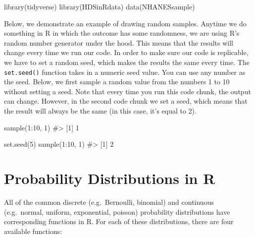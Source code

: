 \documentclass[
  letterpaper,
]{krantz}
\makeatletter
\newenvironment{Shaded}{\begin{snugshade}}{\end{snugshade}}
\newcommand{\CommentTok}[1]{\textcolor[rgb]{0.37,0.37,0.37}{#1}}
\newcommand{\DecValTok}[1]{\textcolor[rgb]{0.68,0.00,0.00}{#1}}
\newcommand{\FunctionTok}[1]{\textcolor[rgb]{0.28,0.35,0.67}{#1}}
\newcommand{\NormalTok}[1]{\textcolor[rgb]{0.00,0.23,0.31}{#1}}
\newcommand{\SpecialCharTok}[1]{\textcolor[rgb]{0.37,0.37,0.37}{#1}}
\newenvironment{kframe}{%
\medskip{}
\setlength{\fboxsep}{.8em}
 \def\at@end@of@kframe{}%
 \ifinner\ifhmode%
  \def\at@end@of@kframe{\end{minipage}}%
  \begin{minipage}{\columnwidth}%
 \fi\fi%
 \def\FrameCommand##1{\hskip\@totalleftmargin \hskip-\fboxsep
 \colorbox{shadecolor}{##1}\hskip-\fboxsep
     \hskip-\linewidth \hskip-\@totalleftmargin \hskip\columnwidth}%
 \MakeFramed {\advance\hsize-\width
   \@totalleftmargin\z@ \linewidth\hsize
   \@setminipage}}%
 {\par\unskip\endMakeFramed%
 \at@end@of@kframe}
\renewenvironment{Shaded}{\begin{kframe}}{\end{kframe}}
\makeatother
\begin{document}
\begin{Shaded}
\begin{Highlighting}[]
\FunctionTok{library}\NormalTok{(tidyverse)}
\FunctionTok{library}\NormalTok{(HDSinRdata)}
\FunctionTok{data}\NormalTok{(NHANESsample)}
\end{Highlighting}
\end{Shaded}

Below, we demonstrate an example of drawing random samples. Anytime we
do something in R in which the outcome has some randomness, we are using
R's random number generator under the hood. This means that the results
will change every time we run our code. In order to make sure our code
is replicable, we have to set a random seed, which makes the results the
same every time. The \texttt{set.seed()} function takes in a numeric
seed value. You can use any number as the seed. Below, we first sample a
random value from the numbers 1 to 10 without setting a seed. Note that
every time you run this code chunk, the output can change. However, in
the second code chunk we set a seed, which means that the result will
always be the same (in this case, it's equal to 2).

\begin{Shaded}
\begin{Highlighting}[]
\FunctionTok{sample}\NormalTok{(}\DecValTok{1}\SpecialCharTok{:}\DecValTok{10}\NormalTok{, }\DecValTok{1}\NormalTok{)}
\CommentTok{\#\textgreater{} [1] 1}
\end{Highlighting}
\end{Shaded}

\begin{Shaded}
\begin{Highlighting}[]
\FunctionTok{set.seed}\NormalTok{(}\DecValTok{5}\NormalTok{)}
\FunctionTok{sample}\NormalTok{(}\DecValTok{1}\SpecialCharTok{:}\DecValTok{10}\NormalTok{, }\DecValTok{1}\NormalTok{)}
\CommentTok{\#\textgreater{} [1] 2}
\end{Highlighting}
\end{Shaded}

\section{Probability Distributions in
R}\label{probability-distributions-in-r}

All of the common discrete (e.g.~Bernoulli, binomial) and continuous
(e.g.~normal, uniform, exponential, poisson) probability distributions
have corresponding functions in R. For each of these distributions,
there are four available functions:
\end{document}
